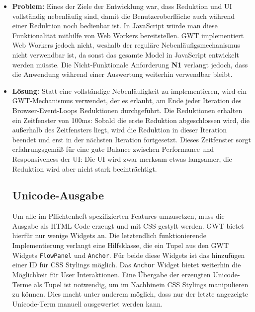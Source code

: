 \documentclass[parskip=full,11pt]{scrartcl}
\begin{document}
\begin{itemize}
\item[] \textbf{Problem:}
Eines der Ziele der Entwicklung war, dass Reduktion und UI vollständig nebenläufig sind, damit die Benutzeroberfläche auch während einer Reduktion noch bedienbar ist.
In JavaScript würde man diese Funktionalität mithilfe von Web Workers bereitstellen.
GWT implementiert Web Workers jedoch nicht, weshalb der reguläre Nebenläufigsmechanismus nicht verwendbar ist, da sonst das gesamte Model in JavaScript entwickelt werden müsste.
Die Nicht-Funktionale Anforderung \textbf{N1} verlangt jedoch, dass die Anwendung während einer Auswertung weiterhin verwendbar bleibt.
\item[] \textbf{Lösung:}
Statt eine vollständige Nebenläufigkeit zu implementieren, wird ein GWT-Mechanismus verwendet, der es erlaubt, am Ende jeder Iteration des Browser-Event-Loops Reduktionen durchgeführt.
Die Reduktionen erhalten ein Zeitfenster von 100ms: Sobald die erste Reduktion abgeschlossen wird, die außerhalb des Zeitfensters liegt, wird die Reduktion in dieser Iteration beendet und erst in der nächsten Iteration fortgesetzt.
Dieses Zeitfenster sorgt erfahrungsgemäß für eine gute Balance zwischen Performance und Responsiveness der UI: Die UI wird zwar merksam etwas langsamer, die Reduktion wird aber nicht stark beeinträchtigt.

\subsection{Unicode-Ausgabe}
Um alle im Pflichtenheft spezifizierten Features umzusetzen, muss die Ausgabe als HTML Code erzeugt und mit CSS gestylt werden. GWT bietet hierfür nur wenige Widgets an. Die letztendlich funktionierende Implementierung verlangt eine Hilfsklasse, die ein Tupel aus den GWT Widgets \texttt{FlowPanel} und \texttt{Anchor}. Für beide diese Widgets ist das hinzufügen einer ID für CSS Stylings möglich. Das \texttt{Anchor} Widget bietet weiterhin die Möglichkeit für User Interaktionen. Eine Übergabe der erzeugten Unicode-Terme als Tupel ist notwendig, um im Nachhinein CSS Stylings manipulieren zu können. Dies macht unter anderem möglich, dass nur der letzte angezeigte Unicode-Term manuell ausgewertet werden kann.


\end{itemize}
\end{document}
